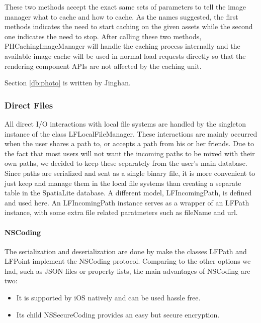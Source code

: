 \documentclass[12pt,a4paper]{article}
\renewcommand\texttt[1]{{\ttfamily\color{textttColor}#1}}
\begin{document}
            These two methods accept the exact same sets of parameters to tell the image manager what to cache and how to cache. As the names suggested, the first methods indicates the need to start caching on the given assets while the second one indicates the need to stop. After calling these two methods, \texttt{PHCachingImageManager} will handle the caching process internally and the available image cache will be used in normal load requests directly so that the rendering component APIs are not affected by the caching unit.
            
            \footnotesize
                Section \ref{db:photo} is written by Jinghan.
            \normalsize
            
            \subsubsection{Direct Files} %
            \label{db:direct-files}
            
            All direct I/O interactions with local file systems are handled by the singleton instance of the class \texttt{LFLocalFileManager}. These interactions are mainly occurred when the user shares a path to, or accepts a path from his or her friends. Due to the fact that most users will not want the incoming paths to be mixed with their own paths, we decided to keep these separately from the user's main database. Since paths are serialized and sent as a single binary file, it is more convenient to just keep and manage them in the local file systems than creating a separate table in the SpatiaLite database. A different model, \texttt{LFIncomingPath}, is defined and used here. An \texttt{LFIncomingPath} instance serves as a wrapper of an \texttt{LFPath} instance, with some extra file related paratmeters such as \texttt{fileName} and \texttt{url}.
            
            \paragraph{NSCoding} 
                The serialization and deserialization are done by make the classes \texttt{LFPath} and \texttt{LFPoint} implement the \texttt{NSCoding} protocol. Comparing to the other options we had, such as JSON files or property lists, the main advantages of \texttt{NSCoding} are two:
                \begin{itemize}
                    \setlength\itemsep{-0.5em}
                    \item It is supported by iOS natively and can be used hassle free.
                    \item Its child \texttt{NSSecureCoding} provides an easy but secure encryption.
                \end{itemize}
                
\end{document}

